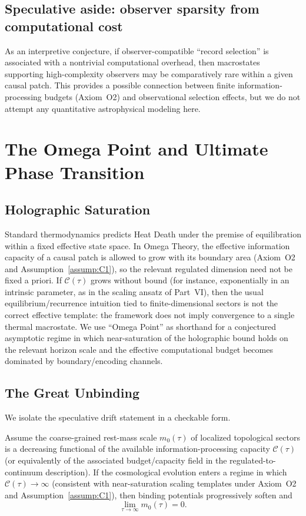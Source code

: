 \subsection{Speculative aside: observer sparsity from computational cost}
As an interpretive conjecture, if observer-compatible ``record selection'' is associated with a nontrivial computational overhead, then macrostates supporting high-complexity observers may be comparatively rare within a given causal patch. This provides a possible connection between finite information-processing budgets (Axiom~O2) and observational selection effects, but we do not attempt any quantitative astrophysical modeling here.

\section{The Omega Point and Ultimate Phase Transition}
\label{chap:omega_point}

\subsection{Holographic Saturation}
Standard thermodynamics predicts Heat Death under the premise of equilibration within a fixed effective state space. In Omega Theory, the effective information capacity of a causal patch is allowed to grow with its boundary area (Axiom~O2 and Assumption~\ref{assump:C1}), so the relevant regulated dimension need not be fixed a priori. If $\mathcal{C}(\tau)$ grows without bound (for instance, exponentially in an intrinsic parameter, as in the scaling ansatz of Part~VI), then the usual equilibrium/recurrence intuition tied to finite-dimensional sectors is not the correct effective template: the framework does not imply convergence to a single thermal macrostate.
We use ``Omega Point'' as shorthand for a conjectured asymptotic regime in which near-saturation of the holographic bound holds on the relevant horizon scale and the effective computational budget becomes dominated by boundary/encoding channels.

\subsection{The Great Unbinding}
We isolate the speculative drift statement in a checkable form.
\begin{conjecture}
\label{conj:great_unbinding}
Assume the coarse-grained rest-mass scale $m_0(\tau)$ of localized topological sectors is a decreasing functional of the available information-processing capacity $\mathcal{C}(\tau)$ (or equivalently of the associated budget/capacity field in the regulated-to-continuum description). If the cosmological evolution enters a regime in which $\mathcal{C}(\tau)\to\infty$ (consistent with near-saturation scaling templates under Axiom~O2 and Assumption~\ref{assump:C1}), then binding potentials progressively soften and
\begin{equation}
    \lim_{\tau \to \infty} m_0(\tau) = 0.
\end{equation}
\end{conjecture}

